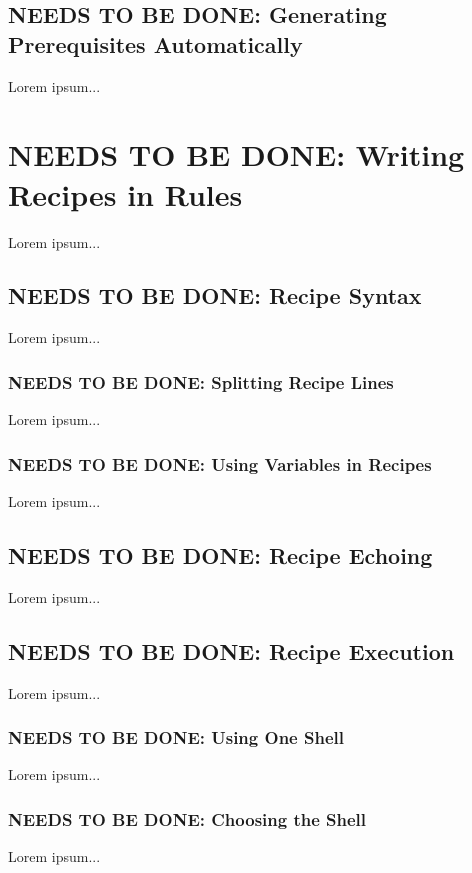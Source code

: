 \documentclass{charun}
\begin{document}
\begin{multicols*}{2}
\color{gray}
\subsection{NEEDS TO BE DONE: Generating Prerequisites Automatically}
Lorem ipsum...
\color{black}


\color{gray}
\section{NEEDS TO BE DONE: Writing Recipes in Rules}
Lorem ipsum...
\color{black}


\color{gray}
\subsection{NEEDS TO BE DONE: Recipe Syntax}
Lorem ipsum...
\color{black}

\color{gray}
\subsubsection{NEEDS TO BE DONE: Splitting Recipe Lines}
Lorem ipsum...
\color{black}

\color{gray}
\subsubsection{NEEDS TO BE DONE: Using Variables in Recipes}
Lorem ipsum...
\color{black}

\color{gray}
\subsection{NEEDS TO BE DONE: Recipe Echoing}
Lorem ipsum...
\color{black}

\color{gray}
\subsection{NEEDS TO BE DONE: Recipe Execution}
Lorem ipsum...
\color{black}

\color{gray}
\subsubsection{NEEDS TO BE DONE: Using One Shell}
Lorem ipsum...
\color{black}

\color{gray}
\subsubsection{NEEDS TO BE DONE: Choosing the Shell}
Lorem ipsum...
\color{black}


\end{multicols*}
\end{document}
